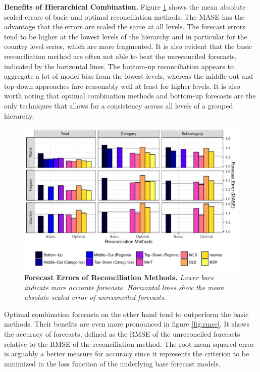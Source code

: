 \documentclass[a4paper,fleqn,11pt]{article}
\begin{document}
\noindent\textbf{Benefits of Hierarchical Combination.} Figure \ref{fig:mase} shows the mean absolute scaled errors of basic and optimal reconciliation methods. The MASE has the advantage that the errors are scaled the same at all levels. The forecast errors tend to be higher at the lowest levels of the hierarchy and in particular for the country level series, which are more fragmented. It is also evident that the basic reconciliation method are often not able to beat the unreconciled forecasts, indicated by the horizontal lines. The bottom-up reconciliation appears to aggregate a lot of model bias from the lowest levels, whereas the middle-out and top-down approaches fare reasonably well at least for higher levels. It is also worth noting that optimal combination methods and bottom-up forecasts are the only techniques that allows for a consistency across all levels of a grouped hierarchy.
\begin{figure}[H]
 	\includegraphics[width=\textwidth]{fig/fig_eval_mase}
 	\caption[Forecast Errors of Reconciliation Methods]{\textbf{Forecast Errors of Reconciliation Methods.} \textit{Lower bars indicate more accurate forecasts. Horizontal lines show the mean absolute scaled error of unreconciled forecasts.}}\label{fig:mase}
 \end{figure}
Optimal combination forecasts on the other hand tend to outperform the basic methods. 
Their benefits are even more pronounced in figure \ref{fig:rmse}. It shows the accuracy of forecasts, defined as the RMSE of the unreconciled forecasts relative to the RMSE of the reconciliation method. The root mean squared error is arguably a better measure for accuracy since it represents the criterion to be minimized in the loss function of the underlying base forecast models.\\
\end{document}
